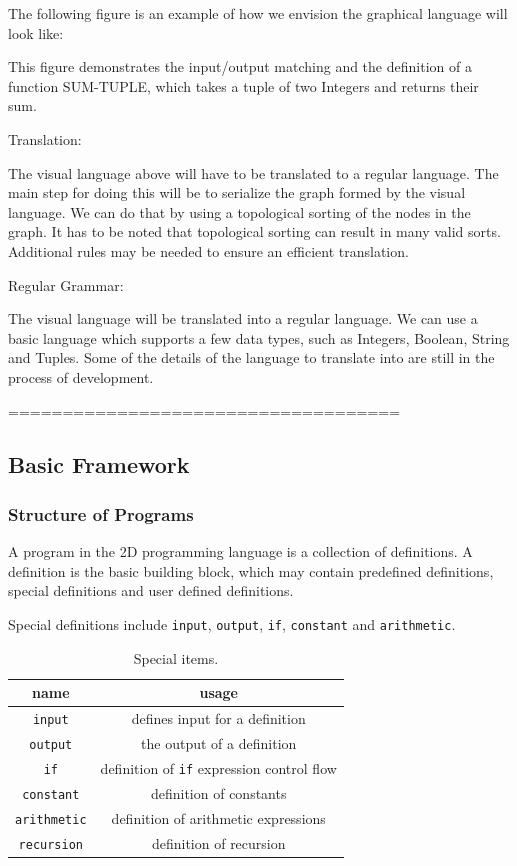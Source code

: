 \documentclass[12pt,UTF8,a4]{article}
\newcommand{\code}[1]{\texttt{#1}}
\begin{document}
The following figure is an example of how we envision the graphical language will look like:

This figure demonstrates the input/output matching and the definition of a function SUM-TUPLE, which takes a tuple of two Integers and returns their sum.

Translation:

The visual language above will have to be translated to a regular language. The main step for doing this will be to serialize the graph formed 
by the visual language. We can do that by using a topological sorting of the nodes in the graph. It has to be noted that topological sorting can result
 in many valid sorts. Additional rules may be needed to ensure an efficient translation.


Regular Grammar:

The visual language will be translated into a regular language. We can use a basic language which  supports a few data types, such as Integers, Boolean, String and Tuples. Some of the details of the language to translate into are still in the process of development.

====================================

\subsection{Basic Framework}
\subsubsection{Structure of Programs}
A program in the 2D programming language is a collection of definitions. A definition is the basic building block, which may contain predefined definitions, special definitions and user defined definitions.

Special definitions include \code{input}, \code{output}, \code{if}, \code{constant} and \code{arithmetic}.
\begin{table}[h]
\center
\begin{tabular}{c|c}
\hline
name & usage \\
\hline
\code{input} & defines input for a definition\\
\code{output} & the output of a definition\\
\code{if} & definition of \code{if} expression control flow \\
\code{constant} & definition of constants \\
\code{arithmetic} & definition of arithmetic expressions \\
\code{recursion} & definition of recursion\\
\hline
\end{tabular}
\caption{Special items.}\label{tab:sitems}
\end{table}
\end{document}
